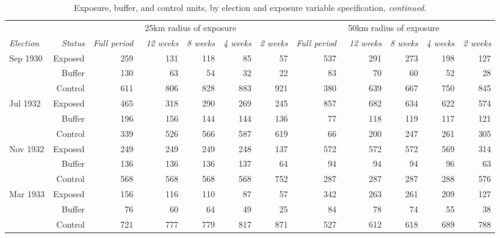\begin{table}[h!]
\centering
\caption{Exposure, buffer, and control units, by election and exposure variable specification, \textit{continued}.\label{tab:treatmentvars2}} 
\begingroup\scriptsize
\begin{tabular}{lrrrrrrrrrrr}
  \toprule
   & & \multicolumn{5}{c}{25km radius of exposure} &  \multicolumn{5}{c}{50km radius of exposure}\\\cmidrule(r){3-7} \cmidrule(r){8-12}\textit{Election} & \textit{Status} & \textit{Full period} & \ \textit{12 weeks} & \textit{8 weeks} & \textit{4 weeks} & \textit{2 weeks} & \textit{Full period} & \ \textit{12 weeks} & \textit{8 weeks} & \textit{4 weeks} & \textit{2 weeks}\\ \midrule
\multirow{3}{*}{Sep 1930} & Exposed & 259 & 131 & 118 & 85 & 57 & 537 & 291 & 273 & 198 & 127 \\ 
   & Buffer & 130 & 63 & 54 & 32 & 22 & 83 & 70 & 60 & 52 & 28 \\ 
   & Control & 611 & 806 & 828 & 883 & 921 & 380 & 639 & 667 & 750 & 845 \\ 
   \midrule
\multirow{3}{*}{Jul 1932} & Exposed & 465 & 318 & 290 & 269 & 245 & 857 & 682 & 634 & 622 & 574 \\ 
   & Buffer & 196 & 156 & 144 & 144 & 136 & 77 & 118 & 119 & 117 & 121 \\ 
   & Control & 339 & 526 & 566 & 587 & 619 & 66 & 200 & 247 & 261 & 305 \\ 
   \midrule
\multirow{3}{*}{Nov 1932} & Exposed & 249 & 249 & 249 & 248 & 137 & 572 & 572 & 572 & 569 & 314 \\ 
   & Buffer & 136 & 136 & 136 & 137 & 64 & 94 & 94 & 94 & 96 & 63 \\ 
   & Control & 568 & 568 & 568 & 568 & 752 & 287 & 287 & 287 & 288 & 576 \\ 
   \midrule
\multirow{3}{*}{Mar 1933} & Exposed & 156 & 116 & 110 & 87 & 57 & 342 & 263 & 261 & 209 & 127 \\ 
   & Buffer & 76 & 60 & 64 & 49 & 25 & 84 & 78 & 74 & 55 & 38 \\ 
   & Control & 721 & 777 & 779 & 817 & 871 & 527 & 612 & 618 & 689 & 788 \\ 
   \bottomrule
\end{tabular}
\endgroup
\end{table}
